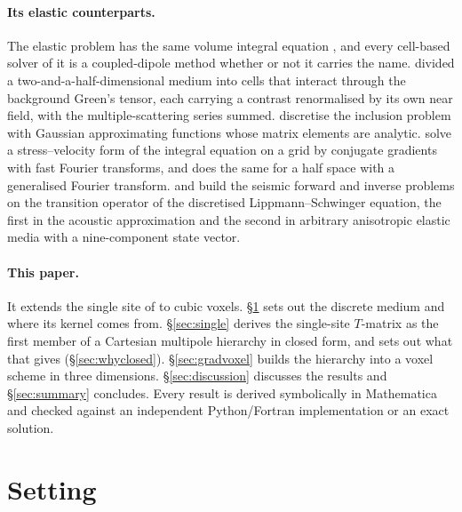 \documentclass[11pt,a4paper]{article}
\begin{document}
\paragraph{Its elastic counterparts.} The elastic problem has the same volume integral equation
\citep{Gubernatis1977}, and every cell-based solver of it is a coupled-dipole method whether or not
it carries the name. \citet{Nestor1996} divided a two-and-a-half-dimensional medium into cells that
interact through the background Green's tensor, each carrying a contrast renormalised by its own
near field, with the multiple-scattering series summed. \citet{Kanaun2013} discretise the inclusion
problem with Gaussian approximating functions whose matrix elements are analytic. \citet{Yang2008}
solve a stress--velocity form of the integral equation on a grid by conjugate gradients with fast
Fourier transforms, and \citet{Touhei2011} does the same for a half space with a generalised Fourier
transform. \citet{Jakobsen2012} and \citet{Jakobsen2020} build the seismic forward and inverse problems on the
transition operator of the discretised Lippmann--Schwinger equation, the first in the acoustic
approximation and the second in arbitrary anisotropic elastic media with a nine-component state vector.


\paragraph{This paper.} It extends the single site of \citet{Nestor1996} to cubic voxels.
\S\ref{sec:setting} sets out the discrete medium and where its kernel comes from. \S\ref{sec:single}
derives the single-site $T$-matrix as the first member of a Cartesian multipole hierarchy in closed form,
and sets out what that gives (\S\ref{sec:whyclosed}). \S\ref{sec:gradvoxel} builds the hierarchy into a
voxel scheme in three dimensions. \S\ref{sec:discussion} discusses the results and \S\ref{sec:summary}
concludes. Every result is derived symbolically in Mathematica and checked against an independent
Python/Fortran implementation or an exact solution.

\section{Setting}\label{sec:setting}
\end{document}
